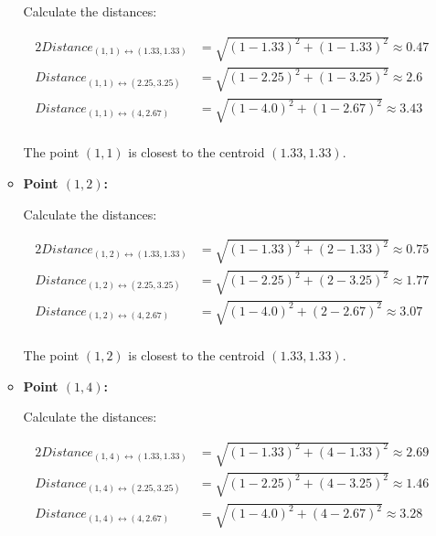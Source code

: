 \documentclass[
english,
smallborders
]{i6prcsht}
\begin{document}
\begin{solution}
\begin{enumerate}
\begin{itemize}
			            Calculate the distances:

			            \begin{alignat*}{2}
				            Distance_{(1,1)\leftrightarrow(1.33,1.33)} & = \sqrt{(1-1.33)^2+(1-1.33)^2} \approx 0.47 \\
				            Distance_{(1,1)\leftrightarrow(2.25,3.25)} & = \sqrt{(1-2.25)^2+(1-3.25)^2} \approx 2.6  \\
				            Distance_{(1,1)\leftrightarrow(4,2.67)}    & = \sqrt{(1-4.0)^2+(1-2.67)^2} \approx 3.43  \\
			            \end{alignat*}

			            The point $(1,1)$ is closest to the centroid $(1.33,1.33)$.

			      \item \textbf{Point $(1,2)$:}

			            Calculate the distances:

			            \begin{alignat*}{2}
				            Distance_{(1,2)\leftrightarrow(1.33,1.33)} & = \sqrt{(1-1.33)^2+(2-1.33)^2} \approx 0.75 \\
				            Distance_{(1,2)\leftrightarrow(2.25,3.25)} & = \sqrt{(1-2.25)^2+(2-3.25)^2} \approx 1.77 \\
				            Distance_{(1,2)\leftrightarrow(4,2.67)}    & = \sqrt{(1-4.0)^2+(2-2.67)^2} \approx 3.07  \\
			            \end{alignat*}

			            The point $(1,2)$ is closest to the centroid $(1.33,1.33)$.

			      \item \textbf{Point $(1,4)$:}

			            Calculate the distances:

			            \begin{alignat*}{2}
				            Distance_{(1,4)\leftrightarrow(1.33,1.33)} & = \sqrt{(1-1.33)^2+(4-1.33)^2} \approx 2.69 \\
				            Distance_{(1,4)\leftrightarrow(2.25,3.25)} & = \sqrt{(1-2.25)^2+(4-3.25)^2} \approx 1.46 \\
				            Distance_{(1,4)\leftrightarrow(4,2.67)}    & = \sqrt{(1-4.0)^2+(4-2.67)^2} \approx 3.28  \\
			            \end{alignat*}


\end{itemize}
\end{enumerate}
\end{solution}
\end{document}
